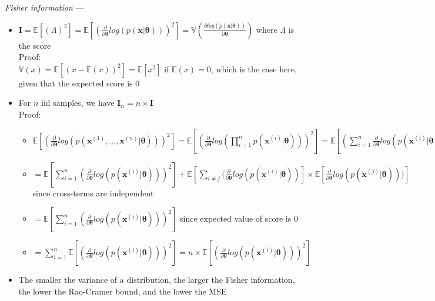 \emph{Fisher information} --- 
\begin{itemize}
    \item $\boldsymbol{I} = \mathbb{E} [(\Lambda)^2] = \mathbb{E} [ ( \frac{\partial}{ \partial \boldsymbol{\theta} } log( p ( \boldsymbol{x} | \boldsymbol{\theta} ) ) )^2 ] = \mathbb{V} ( \frac{ \partial log( p(\boldsymbol{x} | \boldsymbol{\theta}) ) }{ \partial \boldsymbol{\theta}} )$ where $\Lambda$ is the score\\
    Proof:\\
    $\mathbb{V}(x) = \mathbb{E}[(x-\mathbb{E}(x))^2] = \mathbb{E}[x^2]$ if $\mathbb{E}(x) = 0$, which is the case here, given that the expected score is $0$
    \item For $n$ iid samples, we have $\boldsymbol{I}_n = n \times \boldsymbol{I}$\\
    Proof:
    \begin{itemize}
        \item $\mathbb{E} [ ( \frac{\partial}{ \partial \boldsymbol{\theta} } log( p ( \boldsymbol{x}^{(1)}, ..., \boldsymbol{x}^{(n)} | \boldsymbol{\theta} ) ) )^2 ] = \mathbb{E} [ ( \frac{\partial}{ \partial \boldsymbol{\theta} } log( \prod_{i=1}^n p ( \boldsymbol{x}^{(i)} | \boldsymbol{\theta} ) ) )^2 ] = \mathbb{E} [ ( \sum_{i=1}^n \frac{\partial}{ \partial \boldsymbol{\theta} } log( p ( \boldsymbol{x}^{(i)} | \boldsymbol{\theta} ) ) )^2 ] = \mathbb{E} [ \sum_{i=1}^n (\frac{\partial}{ \partial \boldsymbol{\theta} } log( p ( \boldsymbol{x}^{(i)} | \boldsymbol{\theta} ) ) )^2 + \sum_{i \neq j} (\frac{\partial}{ \partial \boldsymbol{\theta} } log( p ( \boldsymbol{x}^{(i)} | \boldsymbol{\theta} ) ) \times \frac{\partial}{ \partial \boldsymbol{\theta} } log( p ( \boldsymbol{x}^{(j)} | \boldsymbol{\theta} ) ) ) ]$
        \item $= \mathbb{E} [ \sum_{i=1}^n (\frac{\partial}{ \partial \boldsymbol{\theta} } log( p ( \boldsymbol{x}^{(i)} | \boldsymbol{\theta} ) ) )^2 ] +  \mathbb{E} [\sum_{i \neq j} (\frac{\partial}{ \partial \boldsymbol{\theta} } log( p ( \boldsymbol{x}^{(i)} | \boldsymbol{\theta} ) )] \times  \mathbb{E} [\frac{\partial}{ \partial \boldsymbol{\theta} } log( p ( \boldsymbol{x}^{(j)} | \boldsymbol{\theta} ) ) ) ]$ since cross-terms are independent
        \item $= \mathbb{E} [ \sum_{i=1}^n (\frac{\partial}{ \partial \boldsymbol{\theta} } log( p ( \boldsymbol{x}^{(i)} | \boldsymbol{\theta} ) ) )^2 ]$ since expected value of score is $0$
        \item $= \sum_{i=1}^n\mathbb{E} [ (\frac{\partial}{ \partial \boldsymbol{\theta} } log( p ( \boldsymbol{x}^{(i)} | \boldsymbol{\theta} ) ) )^2 ] = n \times \mathbb{E} [ (\frac{\partial}{ \partial \boldsymbol{\theta} } log( p ( \boldsymbol{x}^{(i)} | \boldsymbol{\theta} ) ) )^2 ]$
    \end{itemize}
    \item The smaller the variance of a distribution, the larger the Fisher information, the lower the Rao-Cramer bound, and the lower the MSE
\end{itemize}

